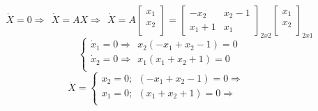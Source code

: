 \documentclass{homeworg}
\begin{document}
\begin{equation} %
  \dot{X} = 0 \Rightarrow~~ \dot{X} = AX \Rightarrow~~ \dot{X} = A
  \begin{bmatrix}
    x_1\\
    x_2\\
  \end{bmatrix}
  =
  \begin{bmatrix}
    -x_2 & x_2 - 1 \\
    x_1 +1 & x_1
  \end{bmatrix}_{2x2}
  \begin{bmatrix}
    x_1\\
    x_2\\
  \end{bmatrix}_{2x1}
\end{equation}
\begin{equation}
  \begin{cases}
    \dot{x}_1 = 0 \Rightarrow~~ x_2(-x_1 + x_2 -1)=0\\
    \dot{x}_2 = 0 \Rightarrow~~ x_1(x_1 + x_2 + 1)=0\\
  \end{cases}
\end{equation}
\begin{equation} %
  \dot{X} =
  \begin{cases}
    x_2 = 0;~~(-x_1 + x_2 -1)=0 \Rightarrow~~\\
    x_1 = 0;~~(x_1 + x_2 + 1)=0 \Rightarrow~~\\
  \end{cases}
\end{equation}



%
\end{document}
